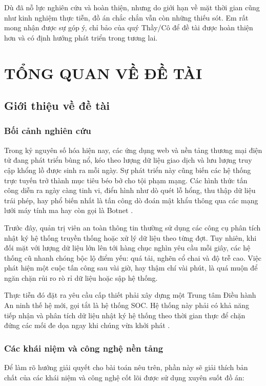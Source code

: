 \documentclass[12pt,a4paper]{report}
\begin{document}
Dù đã nỗ lực nghiên cứu và hoàn thiện, nhưng do giới hạn về mặt thời gian cũng như kinh nghiệm thực tiễn, đồ án chắc chắn vẫn còn những thiếu sót. Em rất mong nhận được sự góp ý, chỉ bảo của quý Thầy/Cô để đề tài được hoàn thiện hơn và có định hướng phát triển trong tương lai.

\newpage

\chapter{TỔNG QUAN VỀ ĐỀ TÀI}

\section{Giới thiệu về đề tài}
\subsection{Bối cảnh nghiên cứu}
Trong kỷ nguyên số hóa hiện nay, các ứng dụng web và nền tảng thương mại điện tử đang phát triển bùng nổ, kéo theo lượng dữ liệu giao dịch và lưu lượng truy cập khổng lồ được sinh ra mỗi ngày. Sự phát triển này cũng biến các hệ thống trực tuyến trở thành mục tiêu béo bở cho tội phạm mạng. Các hình thức tấn công diễn ra ngày càng tinh vi, điển hình như dò quét lỗ hổng, thu thập dữ liệu trái phép, hay phổ biến nhất là tấn công dò đoán mật khẩu thông qua các mạng lưới máy tính ma hay còn gọi là Botnet \cite{owasp2021}.

Trước đây, quản trị viên an toàn thông tin thường sử dụng các công cụ phân tích nhật ký hệ thống truyền thống hoặc xử lý dữ liệu theo từng đợt. Tuy nhiên, khi đối mặt với lượng dữ liệu lớn lên tới hàng chục nghìn yêu cầu mỗi giây, các hệ thống cũ nhanh chóng bộc lộ điểm yếu: quá tải, nghẽn cổ chai và độ trễ cao. Việc phát hiện một cuộc tấn công sau vài giờ, hay thậm chí vài phút, là quá muộn để ngăn chặn rủi ro rò rỉ dữ liệu hoặc sập hệ thống.

Thực tiễn đó đặt ra yêu cầu cấp thiết phải xây dựng một Trung tâm Điều hành An ninh thế hệ mới, gọi tắt là hệ thống SOC. Hệ thống này phải có khả năng tiếp nhận và phân tích dữ liệu nhật ký hệ thống theo thời gian thực để chặn đứng các mối đe dọa ngay khi chúng vừa khởi phát \cite{chapple2021}.

\subsection{Các khái niệm và công nghệ nền tảng}
Để làm rõ hướng giải quyết cho bài toán nêu trên, phần này sẽ giải thích bản chất của các khái niệm và công nghệ cốt lõi được sử dụng xuyên suốt đồ án:
\end{document}
